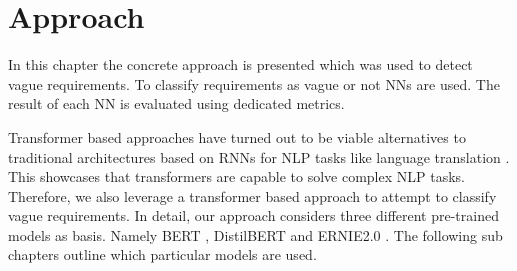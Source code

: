 \chapter{Approach}
\label{chp:approach}


In this chapter the concrete approach is presented which was used to detect vague requirements.
To classify requirements as vague or not \acp{NN} are used.
The result of each \ac{NN} is evaluated using dedicated metrics.

Transformer based approaches have turned out to be viable alternatives to traditional architectures based on \acp{RNN} for \ac{NLP} tasks like language translation \parencites{Gehring:2017}{Vaswani:2017}.
This showcases that transformers are capable to solve complex \ac{NLP} tasks.
Therefore, we also leverage a transformer based approach to attempt to classify vague requirements.
In detail, our approach considers three different pre-trained models as basis.
Namely \ac{BERT} \parencite{Devlin:2018}, \ac{DistilBERT} \parencite{Sanh:2019} and \ac{ERNIE2.0} \parencite{Sun:2019a}.
The following sub chapters outline which particular models are used.




